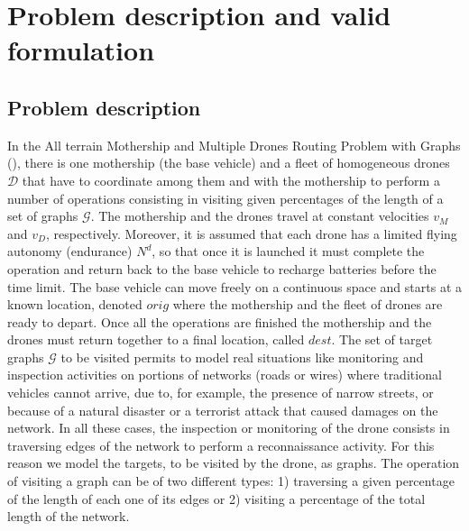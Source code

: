 \section{Problem description and valid formulation}\label{section:desc}

\subsection{Problem description}
In the All terrain Mothership and Multiple Drones Routing Problem with Graphs (\AMD), there is one mothership (the base vehicle) and a fleet of homogeneous drones $\mathcal D$ that have to coordinate among them and with the mothership to perform a number of operations consisting in visiting given percentages of the length of a set of graphs $\mathcal G$. The mothership and the drones travel at constant velocities $v_M$ and $v_D$, respectively. Moreover, it is assumed that each  drone has a limited flying autonomy (endurance) $N^d$, so that once it is launched it must complete the operation and return back to the base vehicle to recharge batteries before the time limit. The base vehicle can move freely on a continuous space and starts at a known location, denoted $orig$ where the mothership and the fleet of drones are ready to depart. Once all the operations are finished the mothership and the drones must return together to a final location, called $dest$. 
\noindent
The set of target graphs $\mathcal G$ to be visited  permits to model real situations like monitoring and inspection activities on portions of networks (roads or wires) where traditional vehicles cannot arrive, due to, for example,  the presence of narrow streets, or because of a natural disaster or a terrorist attack that caused damages on the network. In all these cases, the inspection or monitoring of the drone consists in traversing edges of the network to perform a reconnaissance activity. For this reason we model the targets, to be visited by the drone, as graphs. The operation of visiting a graph can be of two different types: 1) traversing a given percentage of the length of each one of its edges or 2) visiting a percentage of the total length of the network. 


